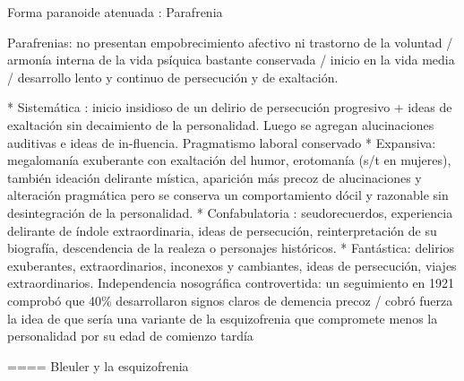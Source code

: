 Forma paranoide atenuada : Parafrenia

Parafrenias: no presentan empobrecimiento afectivo ni trastorno de la voluntad / armonía interna de la vida psíquica bastante conservada / inicio en la vida media / desarrollo lento y continuo de persecución y de exaltación.

* Sistemática : inicio insidioso de un delirio de persecución progresivo + ideas de exaltación sin decaimiento de la personalidad. Luego se agregan alucinaciones auditivas e ideas de in-fluencia. Pragmatismo laboral conservado
* Expansiva: megalomanía exuberante con exaltación del humor, erotomanía (s/t en mujeres), también ideación delirante mística, aparición más precoz de alucinaciones y alteración pragmática pero se conserva un comportamiento dócil y razonable sin desintegración de la personalidad.
* Confabulatoria : seudorecuerdos, experiencia delirante de índole extraordinaria, ideas de persecución, reinterpretación de su biografía, descendencia de la realeza o personajes históricos.
* Fantástica: delirios exuberantes, extraordinarios, inconexos y cambiantes, ideas de persecución, viajes extraordinarios. Independencia nosográfica controvertida: un seguimiento en 1921 comprobó que 40\% desarrollaron signos claros de demencia precoz / cobró fuerza la idea de que sería una variante de la esquizofrenia que compromete menos la personalidad por su edad de comienzo tardía

==== Bleuler y la esquizofrenia

